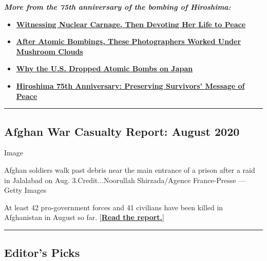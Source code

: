 \emph{\textbf{More from the 75th anniversary of the bombing of
Hiroshima:}}

\begin{itemize}
\item
  \textbf{\href{https://www.nytimes.com/2020/08/06/world/asia/hiroshima-japan-setsuko-thurlow.html}{Witnessing
  Nuclear Carnage, Then Devoting Her Life to Peace}}
\item
  \textbf{\href{https://www.nytimes.com/2020/08/06/world/asia/hiroshima-nagasaki-japan-photos.html}{After
  Atomic Bombings, These Photographers Worked Under Mushroom Clouds}}
\item
  \textbf{\href{https://www.nytimes.com/2020/08/03/books/review/unconditional-marc-gallicchio.html}{Why
  the U.S. Dropped Atomic Bombs on Japan}}
\item
  \textbf{\href{https://www.nytimes.com/2020/08/05/world/asia/hiroshima-japan-75th-anniversary.html}{Hiroshima
  75th Anniversary: Preserving Survivors' Message of Peace}}
\end{itemize}

\begin{center}\rule{0.5\linewidth}{\linethickness}\end{center}

\hypertarget{afghan-war-casualty-report-august-2020}{%
\subsection{Afghan War Casualty Report: August
2020}\label{afghan-war-casualty-report-august-2020}}

Image

Afghan soldiers walk past debris near the main entrance of a prison
after a raid in Jalalabad on Aug. 3.Credit...Noorullah Shirzada/Agence
France-Presse --- Getty Images

At least 42 pro-government forces and 41 civilians have been killed in
Afghanistan in August so far.
{[}\textbf{\href{https://www.nytimes.com/2020/08/06/magazine/afghan-war-casualty-report-august-2020.html}{Read
the report.}}{]}

\begin{center}\rule{0.5\linewidth}{\linethickness}\end{center}

\hypertarget{editors-picks}{%
\subsection{Editor's Picks}\label{editors-picks}}


